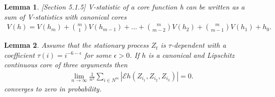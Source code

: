 \documentclass{article} %
\newtheorem{lemma}{Lemma}
\newcommand{\ev}{\mathcal{E}}
\begin{document}
\begin{lemma}
\label{stm:decomposition}[Section 5.1.5]
 V-statistic of a core function h can be written as a sum of  V-statistics with canonical cores
\begin{align}
  V(h) = V(h_m) + \binom m 1 V(h_{m-1}) + ...+ \binom {m} {m-2} V(h_{2}) + \binom {m} {m-1} V(h_{1}) + h_0.
 \end{align}
\end{lemma}


\begin{lemma}
\label{lem:start}
Assume that the stationary process $Z_t$ is $\tau$-dependent with a coefficient $\tau(i) = i^{-6-\epsilon}$ for some $\epsilon>0$. If $h$ is a canonical and Lipschitz continuous core of three arguments then
 \begin{align}
 \lim_{n \to \infty} \frac{1}{n^2} \sum_{i \in N^{m}} |\ev   h(Z_{i_1},Z_{i_2},Z_{i_3})| =0.
\end{align}
converges to zero in probability.
\end{lemma}
\end{document}
